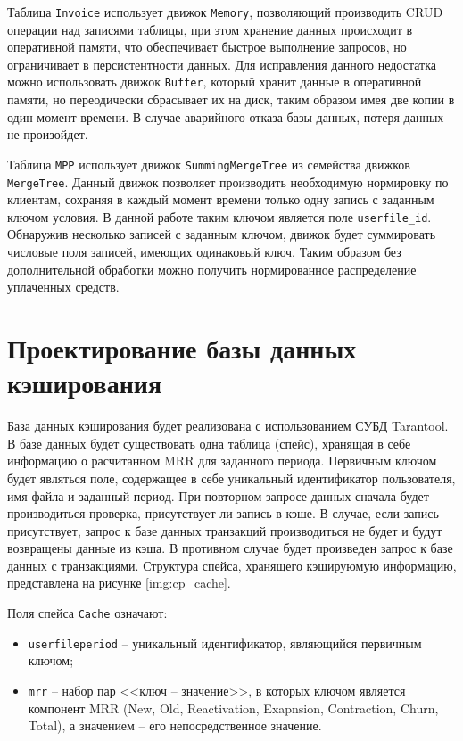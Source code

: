 Таблица \texttt{Invoice} использует движок \texttt{Memory}, позволяющий производить CRUD операции над записями таблицы, при этом хранение данных происходит в оперативной памяти, что обеспечивает быстрое выполнение запросов, но ограничивает в персистентности данных. Для исправления данного недостатка можно использовать движок \texttt{Buffer}, который хранит данные в оперативной памяти, но переодически сбрасывает их на диск, таким образом имея две копии в один момент времени. В случае аварийного отказа базы данных, потеря данных не произойдет.

Таблица \texttt{MPP} использует движок \texttt{SummingMergeTree} из семейства движков \texttt{MergeTree}. Данный движок позволяет производить необходимую нормировку по клиентам, сохраняя в каждый момент времени только одну запись с заданным ключом условия. В данной работе таким ключом является поле \texttt{userfile\_id}. Обнаружив несколько записей с заданным ключом, движок будет суммировать числовые поля записей, имеющих одинаковый ключ. Таким образом без дополнительной обработки можно получить нормированное распределение уплаченных средств.

\section{Проектирование базы данных кэширования}

База данных кэширования будет реализована с использованием СУБД Tarantool. В базе данных будет существовать одна таблица (спейс), хранящая в себе информацию о расчитанном MRR для заданного периода. Первичным ключом будет являться поле, содержащее в себе уникальный идентификатор пользователя, имя файла и заданный период. При повторном запросе данных сначала будет производиться проверка, присутствует ли запись в кэше. В случае, если запись присутствует, запрос к базе данных транзакций производиться не будет и будут возвращены данные из кэша. В противном случае будет произведен запрос к базе данных с транзакциями. Структура спейса, хранящего кэшируюмую информацию, представлена на рисунке \ref{img:cp_cache}.


Поля спейса \texttt{Cache} означают:

\begin{itemize}
	\item \texttt{userfileperiod} -- уникальный идентификатор, являющийся первичным ключом;
	\item \texttt{mrr} -- набор пар <<ключ -- значение>>, в которых ключом является компонент MRR (New, Old, Reactivation, Exapnsion, Contraction, Churn, Total), а значением -- его непосредственное значение.
\end{itemize}

